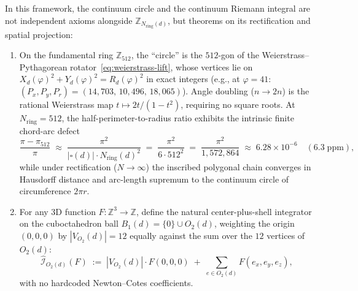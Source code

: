 \documentclass[11pt,a4paper]{article}
\theoremstyle{plain}
\theoremstyle{definition}
\begin{document}
In this framework, the continuum circle and the continuum Riemann integral are not independent axioms alongside $\mathbb{Z}_{N_{\mathrm{ring}}(d)}$, but theorems on its rectification and spatial projection:
\begin{enumerate}[leftmargin=*,noitemsep]
\item On the fundamental ring $\mathbb{Z}_{512}$, the ``circle'' is the $512$-gon of the Weierstrass--Pythagorean rotator~\eqref{eq:weierstrass-lift}, whose vertices lie on $X_d(\varphi)^2+Y_d(\varphi)^2=R_d(\varphi)^2$ in exact integers (e.g., at $\varphi=41$: $(P_x,P_y,P_r)=(14,703,\,10,496,\,18,065)$). Angle doubling ($n\to 2n$) is the rational Weierstrass map $t\mapsto 2t/(1-t^2)$, requiring no square roots. At $N_{\mathrm{ring}}=512$, the half-perimeter-to-radius ratio exhibits the intrinsic finite chord-arc defect
  \begin{equation}
    \label{eq:pi-512-defect}
    \frac{\pi - \pi_{512}}{\pi} \;\approx\; \frac{\pi^2}{|\square(d)|\cdot N_{\mathrm{ring}}(d)^2} \;=\; \frac{\pi^2}{6\cdot 512^2} \;=\; \frac{\pi^2}{1,572,864} \;\approx\; 6.28\times 10^{-6}\quad (6.3\;\text{ppm}),
  \end{equation}
  while under rectification ($N\to\infty$) the inscribed polygonal chain converges in Hausdorff distance and arc-length supremum to the continuum circle of circumference $2\pi r$.
\item For any 3D function $F\colon\mathbb{Z}^3\to\mathbb{Z}$, define the natural center-plus-shell integrator on the cuboctahedron ball $B_1(d)=\{0\}\cup O_2(d)$, weighting the origin $(0,0,0)$ by $|V_{O_2}(d)|=12$ equally against the sum over the $12$ vertices of $O_2(d)$:
  \begin{equation}
    \label{eq:cuboct-3d-integrator}
    \widehat{\mathcal{I}}_{O_2(d)}(F) \;:=\; |V_{O_2}(d)|\cdot F(0,0,0) \;+\; \sum_{e\in O_2(d)} F(e_x,e_y,e_z),
  \end{equation}
  with no hardcoded Newton--Cotes coefficients.
\end{enumerate}
\end{document}
